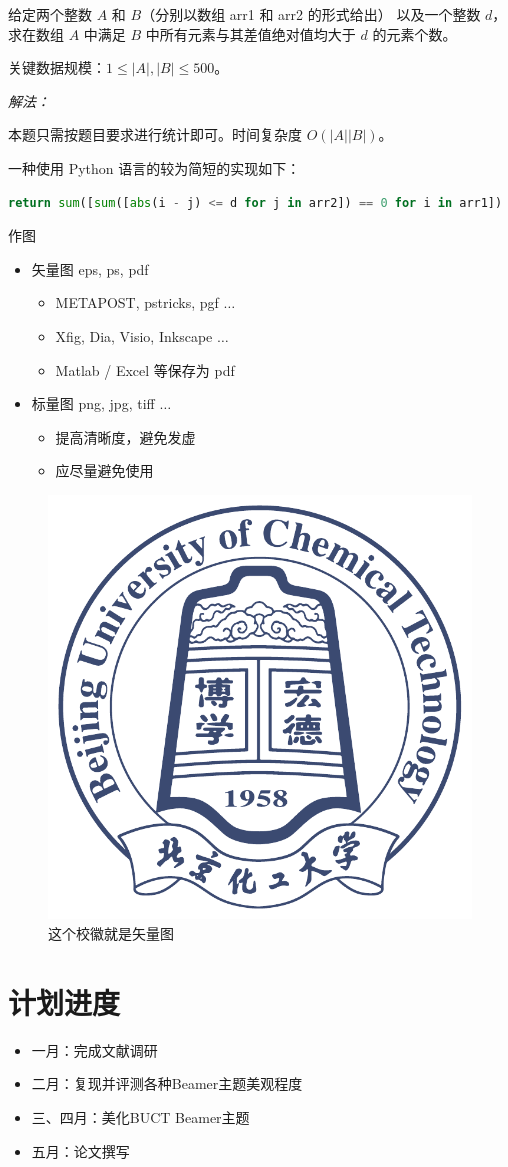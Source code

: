 \documentclass[no-math]{ctexbeamer}
\begin{document}
\begin{frame}[fragile]
    给定两个整数 $A$ 和 $B$（分别以数组 arr1 和 arr2 的形式给出）
    以及一个整数 $d$，求在数组 $A$ 中满足 $B$ 中所有元素与其差值绝对值均大于 $d$ 的元素个数。

    关键数据规模：$1\leq |A|,|B|\leq500$。\bigskip\pause

    \emph{解法：}

    本题只需按题目要求进行统计即可。时间复杂度 $O(|A| |B|)$。
    
    一种使用 Python 语言的较为简短的实现如下：

    \begin{lstlisting}[language=Python, emph={arr1, arr2}]
return sum([sum([abs(i - j) <= d for j in arr2]) == 0 for i in arr1])
    \end{lstlisting}
\end{frame}

\begin{frame}{作图}
    \begin{itemize}
        \item 矢量图 eps, ps, pdf
        \begin{itemize}
            \item METAPOST, pstricks, pgf $\ldots$
            \item Xfig, Dia, Visio, Inkscape $\ldots$
            \item Matlab / Excel 等保存为 pdf
        \end{itemize}
        \item 标量图 png, jpg, tiff $\ldots$
        \begin{itemize}
            \item 提高清晰度，避免发虚
            \item 应尽量避免使用
        \end{itemize}
    \end{itemize}
    \begin{figure}[htpb]
        \centering
        \includegraphics[width=0.2\linewidth]{pic/BUCT-badge.pdf}
        \caption{这个校徽就是矢量图}
    \end{figure}
\end{frame}

\section{计划进度}
\begin{frame}
    \begin{itemize}
        \item 一月：完成文献调研
        \item 二月：复现并评测各种Beamer主题美观程度
        \item 三、四月：美化BUCT Beamer主题
        \item 五月：论文撰写
    \end{itemize}
\end{frame}
\end{document}
